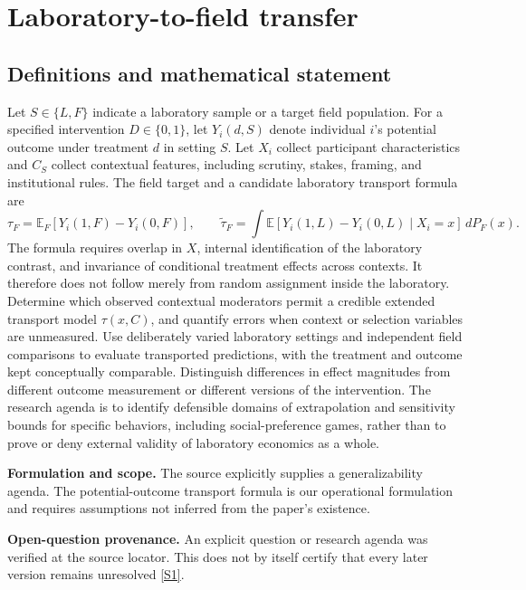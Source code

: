 \documentclass[11pt]{article}
\newcommand{\sref}[2]{\hyperlink{source:#1:#2}{[S#2]}}
\begin{document}
\section*{Laboratory-to-field transfer}\label{30007588}
\subsection{Definitions and mathematical statement}
Let \(S\in\{L,F\}\) indicate a laboratory sample or a target field population. For a specified intervention \(D\in\{0,1\}\), let \(Y_i(d,S)\) denote individual \(i\)'s potential outcome under treatment \(d\) in setting \(S\). Let \(X_i\) collect participant characteristics and \(C_S\) collect contextual features, including scrutiny, stakes, framing, and institutional rules. The field target and a candidate laboratory transport formula are
\[\tau_F=\mathbb E_F[Y_i(1,F)-Y_i(0,F)],\qquad \widetilde\tau_F=\int\mathbb E[Y_i(1,L)-Y_i(0,L)\mid X_i=x]\,dP_F(x).\]
The formula requires overlap in \(X\), internal identification of the laboratory contrast, and invariance of conditional treatment effects across contexts. It therefore does not follow merely from random assignment inside the laboratory. Determine which observed contextual moderators permit a credible extended transport model \(\tau(x,C)\), and quantify errors when context or selection variables are unmeasured. Use deliberately varied laboratory settings and independent field comparisons to evaluate transported predictions, with the treatment and outcome kept conceptually comparable. Distinguish differences in effect magnitudes from different outcome measurement or different versions of the intervention. The research agenda is to identify defensible domains of extrapolation and sensitivity bounds for specific behaviors, including social-preference games, rather than to prove or deny external validity of laboratory economics as a whole.

\par\textbf{Formulation and scope.} The source explicitly supplies a generalizability agenda. The potential-outcome transport formula is our operational formulation and requires assumptions not inferred from the paper’s existence.

\par\textbf{Open-question provenance.} An explicit question or research agenda was verified at the source locator. This does not by itself certify that every later version remains unresolved \sref{30007588}{1}.
\end{document}

